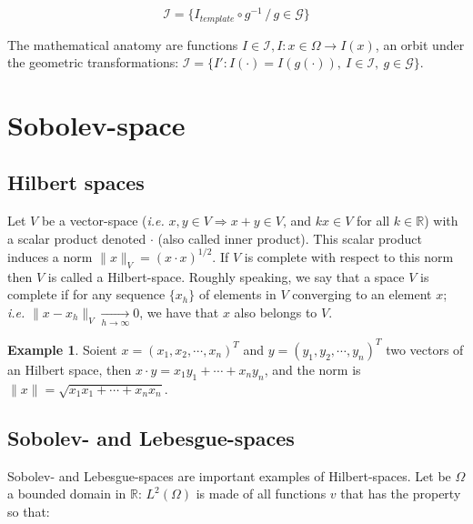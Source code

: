 \documentclass[final, paper=letter,5p,times,twocolumn]{elsarticle}
\theoremstyle{definition}
\newtheorem{example}[theorem]{Example} %
\begin{document}
$$
\mathcal{I} = \{ I_{template} \circ g^{-1} \, / \, g \in \mathcal{G} \}
$$

\begin{definition}
  The mathematical anatomy are functions $I \in \mathcal{I}, I: x \in \Omega \rightarrow I(x)$, an orbit under the geometric transformations: $\mathcal{I} = \lbrace I':I(\cdot) = I(g(\cdot)),~I \in \mathcal{I},~g \in \mathcal{G} \rbrace$.
\end{definition}

\section{Sobolev-space}


\subsection{Hilbert spaces}

Let $V$ be a vector-space ({\it i.e.} $x, y \in V \Rightarrow x + y \in V$, and $kx \in V$ for all $k \in \mathbb{R}$) with a scalar product denoted $\cdot$ (also called inner product). This scalar product induces a norm $\| x \|_{V} = (x \cdot x)^{1/2}$. If $V$ is complete with respect to this norm then $V$ is called a Hilbert-space. Roughly speaking, we say that a space $V$ is complete if for any sequence $\{ x_{h} \}$ of elements in $V$ converging to an element $x$; {\it i.e.} $ \| x - x_{h}\|_{V} \underset{h \rightarrow \infty}{\rightarrow} 0$, we have that $x$ also belongs to $V$.

\begin{example}
  Soient $x = (x_{1}, x_{2}, \cdots, x_{n})^{T}$ and $y = (y_{1}, y_{2}, \cdots, y_{n})^{T}$ two vectors of an Hilbert space, then $x \cdot y = x_{1}y_{1} + \cdots + x_{n}y_{n}$, and the norm is $\| x \| = \sqrt{x_{1}x_{1} + \cdots + x_{n}x_{n}}$.
\end{example}
  

\subsection{Sobolev- and Lebesgue-spaces}

Sobolev- and Lebesgue-spaces are important examples of Hilbert-spaces. Let be $\Omega$ a bounded domain in $\mathbb{R}$: $L^{2}(\Omega)$ is made of all functions $v$ that has the property so that: \\
\end{document}
